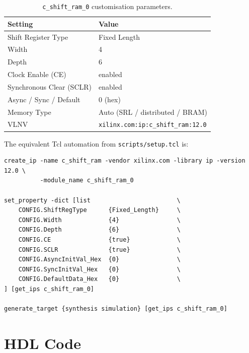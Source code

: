\documentclass[11pt,letterpaper]{article}
\begin{document}
\begin{table}[H]
    \centering
    \caption{\texttt{c\_shift\_ram\_0} customisation parameters.}
    \label{tab:ipconfig}
    \begin{tabular}{ll}
        \toprule
        \textbf{Setting} & \textbf{Value} \\
        \midrule
        Shift Register Type       & Fixed Length                      \\
        Width                     & 4                                 \\
        Depth                     & 6                                 \\
        Clock Enable (CE)         & enabled                           \\
        Synchronous Clear (SCLR)  & enabled                           \\
        Async / Sync / Default    & $0$ (hex)                         \\
        Memory Type               & Auto (SRL / distributed / BRAM)   \\
        VLNV                      & \texttt{xilinx.com:ip:c\_shift\_ram:12.0} \\
        \bottomrule
    \end{tabular}
\end{table}

The equivalent Tcl automation from \texttt{scripts/setup.tcl} is:

\begin{lstlisting}[style=tcl,caption={Key IP generation excerpt from setup.tcl}]
create_ip -name c_shift_ram -vendor xilinx.com -library ip -version 12.0 \
          -module_name c_shift_ram_0

set_property -dict [list                        \
    CONFIG.ShiftRegType      {Fixed_Length}     \
    CONFIG.Width             {4}                \
    CONFIG.Depth             {6}                \
    CONFIG.CE                {true}             \
    CONFIG.SCLR              {true}             \
    CONFIG.AsyncInitVal_Hex  {0}                \
    CONFIG.SyncInitVal_Hex   {0}                \
    CONFIG.DefaultData_Hex   {0}                \
] [get_ips c_shift_ram_0]

generate_target {synthesis simulation} [get_ips c_shift_ram_0]
\end{lstlisting}

\section{HDL Code}
\end{document}
